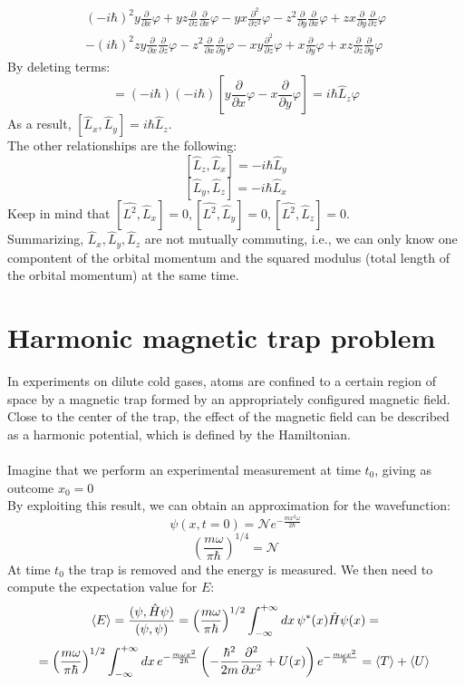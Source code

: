 \begin{multline}
(-i \hbar)^{2}{y \frac{\partial}{\partial x} \varphi+y z \frac{\partial}{\partial z} \frac{\partial}{\partial x} \varphi-y x \frac{\partial^{2}}{\partial z^{2}} \varphi-z^{2} \frac{\partial}{\partial y} \frac{\partial}{\partial x} \varphi+z x \frac{\partial}{\partial y} \frac{\partial}{\partial z} \varphi} \\-(i\hbar)^{2}{z y \frac{\partial}{\partial x} \frac{\partial}{\partial z} \varphi-z^{2} \frac{\partial}{\partial x} \frac{\partial}{\partial y} \varphi-x y \frac{\partial^{2}}{\partial z} \varphi+x \frac{\partial}{\partial y} \varphi+x z \frac{\partial}{\partial z} \frac{\partial}{\partial y} \varphi}
\end{multline}
By deleting terms:
$$=(-i \hbar)(-i \hbar)[y \frac{\partial}{\partial x} \varphi-x\frac{\partial}{\partial y}\varphi] = i\hbar \hat{L}_{z}\varphi$$
As a result, $\left[\hat{L}_{x}, \hat{L}_{y}\right]=i\hbar \hat{L}_{z}$.\\

\noindent
The other relationships are the following:
$$\left[\hat{L}_{z}, \hat{L}_{x}\right]=-i \hbar \hat{L}_{y}$$
$$\left[\hat{L}_{y}, \hat{L}_{z}\right]=-i \hbar \hat{L}_{x}$$
Keep in mind that $[\hat{L^2}, \hat{L}_{x}]=0,[\hat{L^2}, \hat{L}_{y}]=0,[\hat{L^2}, \hat{L}_{z}]=0$.\\
\noindent
Summarizing,  $\hat{L}_{x},\hat{L}_{y},\hat{L}_{z}$ are not mutually commuting, i.e., we can only know one compontent of the orbital momentum and the squared modulus (total length of the orbital momentum) at the same time.

\section{Harmonic magnetic trap problem}
In experiments on dilute cold gases, atoms are confined to a certain region of space by a magnetic trap formed by an appropriately configured magnetic field. 
Close to the center of the trap, the effect of the magnetic field can be described as a harmonic potential, which is defined by the Hamiltonian.\\
\\
Imagine that we perform an experimental measurement at time $t_0$, giving as outcome $x_{0}=0$ \\
By exploiting this result, we can obtain an approximation for the wavefunction:
$$\psi(x,t=0)= \mathcal{N} e^{-\frac{m x^{2} \omega}{2 \hbar}}$$
$$
\left(\frac{m \omega}{ \pi \hbar}\right)^{1 / 4}=\mathcal{N}
$$
\noindent
At time $t_0$ the trap is removed and the energy is measured.
We then need to compute the expectation value for $E$:
$$\expval{E} =\frac{(\psi, \hat{H} \psi)}{(\psi, \psi)}=\left(\frac{m \omega}{ \pi \hbar}\right)^{1 / 2} \int_{-\infty}^{+\infty}d x\, \psi^{*}(x) \hat{H} \psi(x)=$$
$$ =\left(\frac{m \omega}{ \pi \hbar}\right)^{1 / 2} \int_{-\infty}^{+\infty} d x\,e^{-\frac{m \omega x^{2}}{2 \hbar}}\left(-\frac{\hbar^{2}}{2 m} \frac{\partial^{2}}{\partial x^{2}}+U(x)\right) e^{-\frac{m \omega x^{2}}{ \hbar}}=
\expval{T}+\expval{U}\\$$

